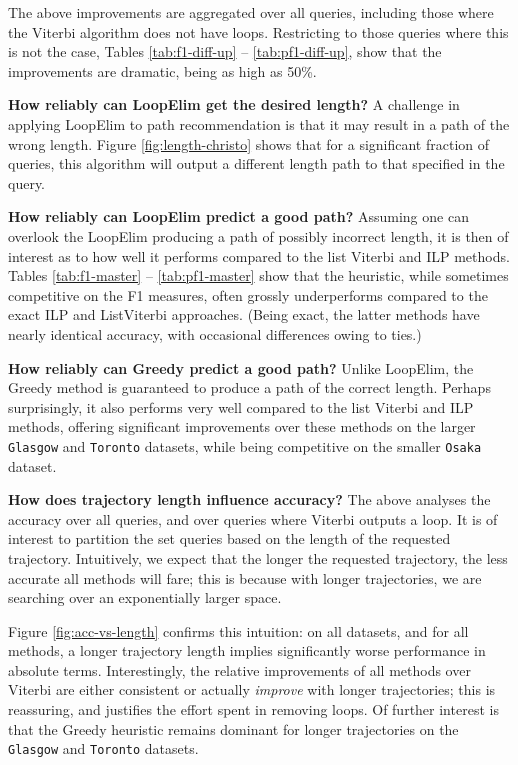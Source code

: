 The above improvements are aggregated over all queries, including those where the {\sc Viterbi} algorithm does not have loops.
Restricting to those queries where this is not the case,
Tables \ref{tab:f1-diff-up} -- \ref{tab:pf1-diff-up},
show that the improvements are dramatic, being as high as 50\%.

\textbf{How reliably can {\sc LoopElim} get the desired length?}
A challenge in applying {\sc LoopElim} to path recommendation
is that it may result in a path of the wrong length.
Figure \ref{fig:length-christo} shows that for a significant fraction of queries, this algorithm will output a different length path to that specified in the query.

\textbf{How reliably can {\sc LoopElim} predict a good path?}
Assuming one can overlook the {\sc LoopElim} producing a path of possibly incorrect length,
it is then of interest as to how well it performs compared to the list Viterbi and ILP methods.
Tables \ref{tab:f1-master} -- \ref{tab:pf1-master} show that the heuristic, while sometimes competitive on the F1 measures, often
grossly underperforms compared to the exact {\sc ILP} and {\sc ListViterbi} approaches.
(Being exact, the latter methods have nearly identical accuracy, with occasional differences owing to ties.)


\textbf{How reliably can {\sc Greedy} predict a good path?}
Unlike {\sc LoopElim}, the {\sc Greedy} method is guaranteed to produce a path of the correct length.
Perhaps surprisingly, it also performs very well compared to the list Viterbi and ILP methods, 
offering significant improvements over these methods on the larger {\tt Glasgow} and {\tt Toronto} datasets,
while being competitive on the smaller {\tt Osaka} dataset.


\textbf{How does trajectory length influence accuracy?}
The above analyses the accuracy over all queries, and over queries where {\sc Viterbi} outputs a loop.
It is of interest to partition the set queries based on the length of the requested trajectory.
Intuitively, we expect that the longer the requested trajectory, the less accurate all methods will fare; this is because with longer trajectories, we are searching over an exponentially larger space.

Figure \ref{fig:acc-vs-length} confirms this intuition:
on all datasets, and for all methods,
a longer trajectory length implies significantly worse performance in absolute terms.
Interestingly, the relative improvements of all methods over {\sc Viterbi} are either consistent or actually \emph{improve} with longer trajectories;
this is reassuring, and justifies the effort spent in removing loops.
Of further interest is that the {\sc Greedy} heuristic remains dominant for longer trajectories on the {\tt Glasgow} and {\tt Toronto} datasets.


